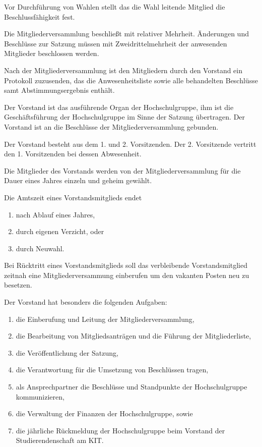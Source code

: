 \documentclass[a4paper, parskip=half, numbers=noenddot]{scrartcl}
\begin{document}
\begin{contract}
Vor Durchführung von Wahlen stellt das die Wahl leitende Mitglied die
Beschlussfähigkeit fest.

Die Mitgliederversammlung beschließt mit relativer Mehrheit.
Änderungen und Beschlüsse zur Satzung müssen mit Zweidrittelmehrheit der
anwesenden Mitglieder beschlossen werden.

Nach der Mitgliederversammlung ist den Mitgliedern durch den Vorstand ein
Protokoll zuzusenden, das die Anwesenheitsliste sowie alle behandelten
Beschlüsse samt Abstimmungsergebnis enthält.



%
%


Der Vorstand ist das ausführende Organ der Hochschulgruppe, ihm ist die
Geschäftsführung der Hochschulgruppe im Sinne der Satzung übertragen.
Der Vorstand ist an die Beschlüsse der Mitgliederversammlung gebunden.

Der Vorstand besteht aus dem 1. und 2. Vorsitzenden.
Der 2. Vorsitzende vertritt den 1. Vorsitzenden bei dessen Abwesenheit.

Die Mitglieder des Vorstands werden von der Mitgliederversammlung für die Dauer
eines Jahres einzeln und geheim gewählt.

Die Amtszeit eines Vorstandsmitglieds endet
\begin{enumerate}
  \item nach Ablauf eines Jahres,
  \item durch eigenen Verzicht, oder
  \item durch Neuwahl.
\end{enumerate}
Bei Rücktritt eines Vorstandsmitglieds soll das verbleibende Vorstandsmitglied
zeitnah eine Mitgliederversammung einberufen um den vakanten Posten neu zu
besetzen.

Der Vorstand hat besonders die folgenden Aufgaben:
\begin{enumerate}
  \item die Einberufung und Leitung der Mitgliederversammlung,
  \item die Bearbeitung von Mitgliedsanträgen und die Führung der
    Mitgliederliste,
  \item die Veröffentlichung der Satzung,
  \item die Verantwortung für die Umsetzung von Beschlüssen tragen,
  \item als Ansprechpartner die Beschlüsse und Standpunkte der Hochschulgruppe
    kommunizieren,
  \item die Verwaltung der Finanzen der Hochschulgruppe, sowie
  \item die jährliche Rückmeldung der Hochschulgruppe beim Vorstand der
    Studierendenschaft am KIT.
\end{enumerate}


\end{contract}
\end{document}
